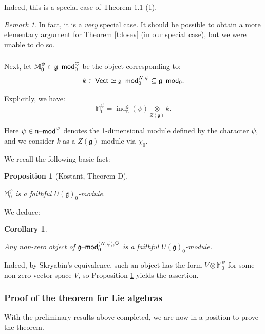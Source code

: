 \documentclass[reqno,11pt]{amsart}
\numberwithin{equation}{subsection}
\newtheorem{cor}[thm]{Corollary}
\newtheorem{prop}[thm]{Proposition}
\theoremstyle{remark}
\newtheorem{rem}[thm]{Remark}
\newcommand{\bM}{{\mathbb M}}
\newcommand{\fg}{{\mathfrak g}}
\newcommand{\fn}{{\mathfrak n}}
\newcommand{\on}{\operatorname}
\newcommand{\mathendash}{\text{\textendash}}
\newcommand{\ind}{\on{ind}}
\newcommand{\Vect}{\mathsf{Vect}}
\renewcommand{\mod}{\mathendash\mathsf{mod}}
\newcommand{\heart}{\heartsuit}
\renewcommand{\subset}{\subseteq}
\begin{document}
Indeed, this is a special case of 
\cite{losev-holonomic} Theorem 1.1 (1). 

\begin{rem}

In fact, it is a \emph{very} special case. It should 
be possible to obtain a more elementary argument for 
Theorem \ref{t:losev} (in our special case), but we were unable to 
do so.

\end{rem}

\subsubsection{}

Next, let $\bM_0^{\psi} \in \fg\mod_0^{\heart}$ be the object
corresponding to:
%
\[
k \in \Vect \simeq \fg\mod_0^{N,\psi} \subset \fg\mod_0.
\]

\noindent Explicitly, we have:
%
\[
\bM_0^{\psi} = \ind_{\fn}^{\fg}(\psi) \underset{Z(\fg)}{\otimes} k.
\]

\noindent Here $\psi \in \fn\mod^{\heart}$ denotes the 1-dimensional
module defined by the character $\psi$, and we consider
$k$ as a $Z(\fg)$-module via $\chi_0$.

We recall the following basic fact:

\begin{prop}[Kostant, \cite{kostant-whittaker} Theorem D]\label{p:whit-faithful}

$\bM_0^{\psi}$ is a faithful $U(\fg)_0$-module.

\end{prop}

We deduce:

\begin{cor}\label{c:whit-faithful}

Any non-zero object of $\fg\mod_0^{(N,\psi),\heart}$ is a faithful
$U(\fg)_0$-module.

\end{cor}

Indeed, by Skryabin's equivalence, such an object has the form $V \otimes \bM_0^{\psi}$
for some non-zero vector space $V$, so Proposition \ref{p:whit-faithful} yields
the assertion.

\subsubsection{Proof of the theorem for Lie algebras}

With the preliminary results above completed, we are now in a 
position to prove the theorem.
\end{document}
